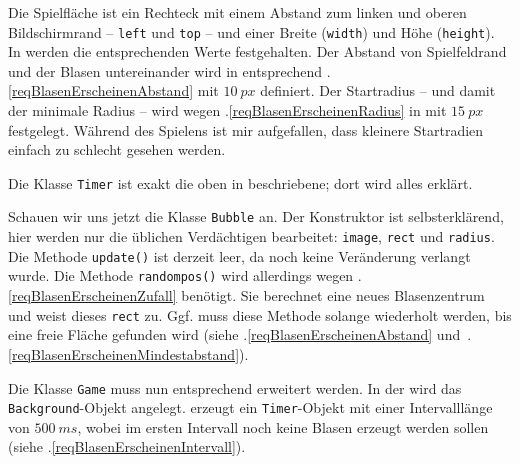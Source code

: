 Die Spielfläche ist ein Rechteck mit einem Abstand zum linken und oberen Bildschirmrand -- \texttt{left} und \texttt{top} -- und einer Breite (\texttt{width}) und Höhe (\texttt{height}). In  werden die entsprechenden Werte festgehalten. Der Abstand von Spielfeldrand und der Blasen untereinander wird in  entsprechend .\ref{reqBlasenErscheinenAbstand} mit $10~px$ definiert. Der Startradius -- und damit der minimale Radius -- wird wegen .\ref{reqBlasenErscheinenRadius} in  mit $15~px$ festgelegt. Während des Spielens ist mir aufgefallen, dass kleinere Startradien einfach zu schlecht gesehen werden.


Die Klasse \texttt{Timer} ist exakt die oben in  beschriebene; dort wird alles erklärt.


Schauen wir uns jetzt die Klasse \texttt{Bubble} an. Der Konstruktor ist selbsterklärend, hier werden nur die üblichen Verdächtigen bearbeitet: \texttt{image}, \texttt{rect} und \texttt{radius}. Die Methode \texttt{update()} ist derzeit leer, da noch keine Veränderung verlangt wurde. Die Methode \texttt{randompos()} wird allerdings wegen .\ref{reqBlasenErscheinenZufall} benötigt. Sie berechnet eine neues Blasenzentrum und weist dieses \texttt{rect} zu. Ggf. muss diese Methode solange wiederholt werden, bis eine freie Fläche gefunden wird (siehe .\ref{reqBlasenErscheinenAbstand} und~.\ref{reqBlasenErscheinenMindestabstand}).


Die Klasse \texttt{Game} muss nun entsprechend erweitert werden. In der  wird das \texttt{Background}-Objekt angelegt.  erzeugt ein \texttt{Timer}-Objekt mit einer Intervalllänge von $500~ms$, wobei im ersten Intervall noch keine Blasen erzeugt werden sollen (siehe .\ref{reqBlasenErscheinenIntervall}).


